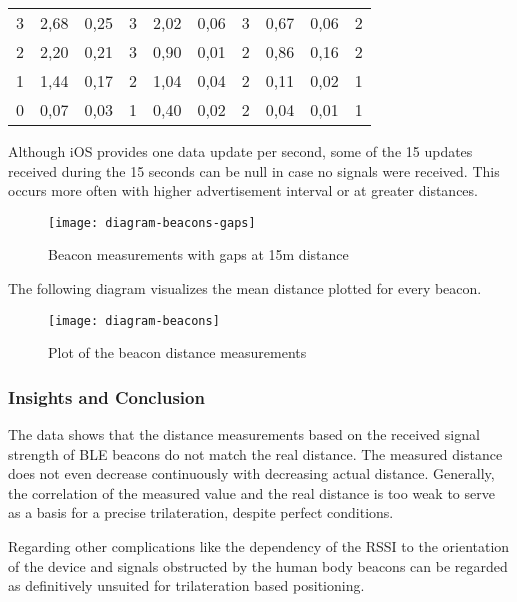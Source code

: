 \begin{table}[h]
\begin{tabular}{l|rrr|rrr|rrr}
3             & 2,68   & 0,25           & 3         & 2,02   & 0,06            & 3          & 0,67  & 0,06           & 2         \\
2             & 2,20   & 0,21           & 3         & 0,90   & 0,01            & 2          & 0,86  & 0,16           & 2         \\
1             & 1,44   & 0,17           & 2         & 1,04   & 0,04            & 2          & 0,11  & 0,02           & 1         \\
0             & 0,07   & 0,03           & 1         & 0,40   & 0,02            & 2          & 0,04  & 0,01           & 1        
\end{tabular}
\end{table}

Although iOS provides one data update per second, some of the 15 updates received during the 15 seconds can be null in case no signals were received. This occurs more often with higher advertisement interval or at greater distances.

\begin{figure}[H]
\centering
\texttt{[image: diagram-beacons-gaps]}
\caption{Beacon measurements with gaps at 15m distance}
\end{figure}

The following diagram visualizes the mean distance plotted for every beacon.

\begin{figure}[H]
\centering
\texttt{[image: diagram-beacons]}
\caption{Plot of the beacon distance measurements}
\end{figure}

\subsubsection*{Insights and Conclusion}

The data shows that the distance measurements based on the received signal strength of BLE beacons do not match the real distance. The measured distance does not even decrease continuously with decreasing actual distance. Generally, the correlation of the measured value and the real distance is too weak to serve as a basis for a precise trilateration, despite perfect conditions. 

Regarding other complications like the dependency of the RSSI to the orientation of the device and signals obstructed by the human body beacons can be regarded as definitively unsuited for trilateration based positioning.

